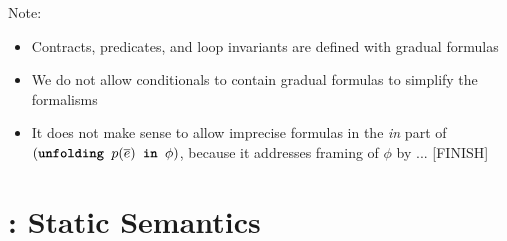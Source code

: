 \documentclass {llncs}
\begin{document}
\noindent Note:
\begin{itemize}
\item Contracts, predicates, and loop invariants are defined with gradual formulas
\item We do not allow conditionals to contain gradual formulas to simplify the formalisms
\item It does not make sense to allow imprecise formulas in the \textit{in} part of $(\textup{\texttt{\textbf{unfolding }}}{p(\overline{e})}\textup{\texttt{\textbf{ in }}}{\phi})$, because it addresses framing of $\phi$ by ... [FINISH]
\end{itemize}


\section{\gvlrp: Static Semantics}
\label{sec:gvlrp}
\label{sec:gvlrp-statics}

\end{document}
